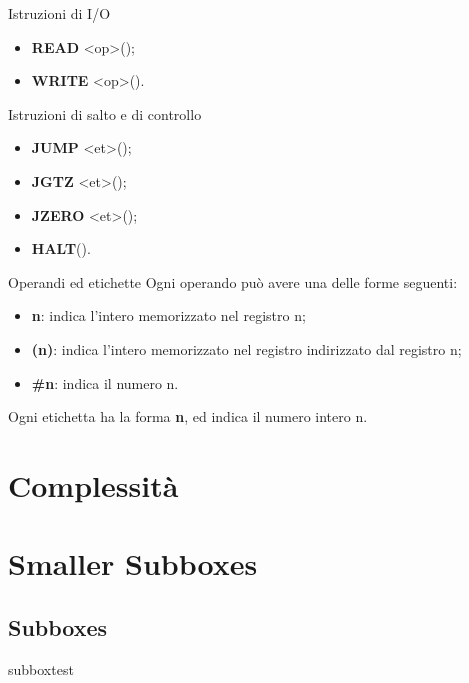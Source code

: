 \documentclass[10pt,a4paper]{article}
\begin{document}
\begin{multicols}{3}
\begin{textbox}{Istruzioni di I/O}
\begin{itemize}[leftmargin=*]
    \item \textbf{READ} <op>\quad();
    \item \textbf{WRITE} <op>\quad().
\end{itemize}
\end{textbox}

\begin{textbox}{Istruzioni di salto e di controllo}
\begin{itemize}[leftmargin=*]
    \item \textbf{JUMP} <et>\quad();
    \item \textbf{JGTZ} <et>\quad();
    \item \textbf{JZERO} <et>\quad();
    \item \textbf{HALT}\quad().
\end{itemize}
\end{textbox}

\begin{textbox}{Operandi ed etichette}
Ogni operando  può avere una delle forme seguenti:
\begin{itemize}[leftmargin=*]
    \item \textbf{n}:  indica l’intero memorizzato nel registro n;
    \item \textbf{(n)}:  indica l’intero memorizzato nel registro indirizzato dal
    registro n;
    \item \textbf{\#n}:  indica il numero n.
\end{itemize}
Ogni etichetta  ha la forma \textbf{n}, ed indica il numero intero n.
\end{textbox}

\section{Complessità}


\newpage
\section{Smaller Subboxes}
\subsection{Subboxes}
\begin{multibox}{2} %
\begin{subbox}{subbox}{test}
\tiny



\end{subbox}
\end{multibox}
\end{multicols}
\end{document}
